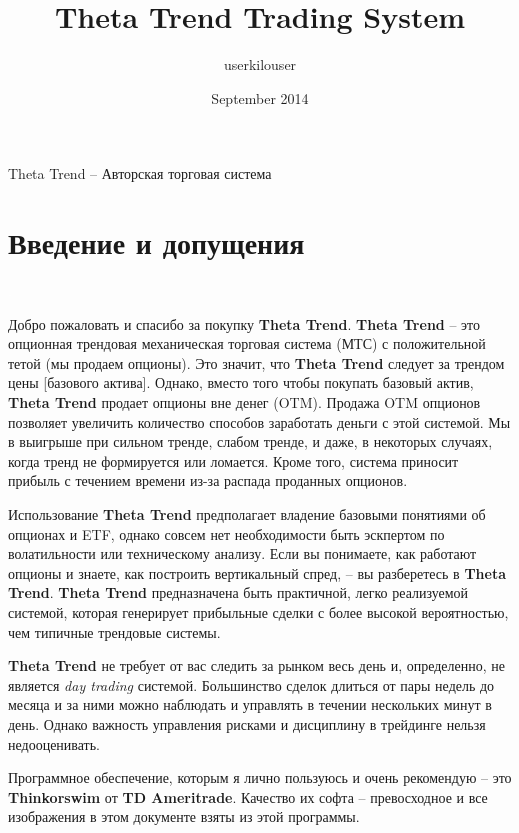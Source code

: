 \documentclass[12pt,DIV=18]{scrartcl}
\title{Theta Trend Trading System}
\author{userkilouser}
\date{September 2014}
\begin{document}
\maketitle
Theta Trend -- Авторская торговая система


\tableofcontents

\section*{Введение и допущения}
\label{intro}
\textcolor{White}{.}

Добро пожаловать и спасибо за покупку \textbf{Theta Trend}. \textbf{Theta Trend} -- это опционная трендовая механическая торговая система (МТС) с положительной тетой (мы продаем опционы). Это значит, что \textbf{Theta Trend} следует за трендом цены [базового актива]. Однако, вместо того чтобы покупать базовый актив, \textbf{Theta Trend} продает опционы вне денег (OTM). Продажа OTM опционов позволяет увеличить количество способов заработать деньги с этой системой. Мы в выигрыше при сильном тренде, слабом тренде, и даже, в некоторых случаях, когда тренд не формируется или ломается. Кроме того, система приносит прибыль с течением времени из-за распада проданных опционов.

\bigskip

Использование \textbf{Theta Trend} предполагает владение базовыми понятиями об опционах и ETF, однако совсем нет необходимости быть эскпертом по волатильности или техническому анализу. Если вы понимаете, как работают опционы и знаете, как построить вертикальный спред, -- вы разберетесь в \textbf{Theta Trend}. \textbf{Theta Trend} предназначена быть практичной, легко реализуемой системой, которая генерирует прибыльные сделки с более высокой вероятностью, чем типичные трендовые системы.

\bigskip

\textbf{Theta Trend} не требует от вас следить за рынком весь день и, определенно, не является \textit{day trading} системой. Большинство сделок длиться от пары недель до месяца и за ними можно наблюдать и управлять в течении нескольких минут в день. Однако важность управления рисками и дисциплину в трейдинге нельзя недооценивать.

\bigskip

Программное обеспечение, которым я лично пользуюсь и очень рекомендую -- это \textbf{Thinkorswim} от \textbf{TD Ameritrade}. Качество их софта -- превосходное и все изображения в этом документе взяты из этой программы.
\end{document}
